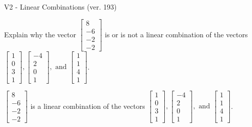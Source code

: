 \begin{exercise}
  \begin{exerciseTitle}V2 - Linear Combinations (ver. 193)\end{exerciseTitle}
  \begin{exerciseStatement}
    Explain why the vector \(\left[\begin{array}{c}
8 \\
-6 \\
-2 \\
-2
\end{array}\right]\)  is or is not a linear 
	combination of the vectors \(\left[\begin{array}{c}
1 \\
0 \\
3 \\
1
\end{array}\right] , \left[\begin{array}{c}
-4 \\
2 \\
0 \\
1
\end{array}\right] , \text{ and } \left[\begin{array}{c}
1 \\
1 \\
4 \\
1
\end{array}\right]\).
	


  \end{exerciseStatement}
  \begin{exerciseAnswer}
   \(\left[\begin{array}{c}
8 \\
-6 \\
-2 \\
-2
\end{array}\right]\) 
  	 is  
	a linear combination of the vectors \(\left[\begin{array}{c}
1 \\
0 \\
3 \\
1
\end{array}\right] , \left[\begin{array}{c}
-4 \\
2 \\
0 \\
1
\end{array}\right] , \text{ and } \left[\begin{array}{c}
1 \\
1 \\
4 \\
1
\end{array}\right]\).

	
  


  \end{exerciseAnswer}
\end{exercise}